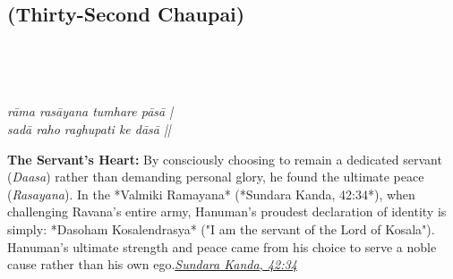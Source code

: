 \subsection*{ (Thirty-Second Chaupai)}

\begin{minipage}[t]{0.55\textwidth}
\vspace{0pt}

{\large \linespread{1.5}\selectfont
{}\\
\par}

\vspace{0.5em}

{\large \linespread{1.5}\selectfont
{}\\
\par}

\vspace{0.5em}

{\large \linespread{1.3}\selectfont
\textit{rāma rasāyana tumhare pāsā |}\\
\textit{sadā raho raghupati ke dāsā ||}
\par}
\end{minipage}%
\hfill
\begin{minipage}[t]{0.42\textwidth}
\vspace{0pt}
\begin{tcolorbox}[anchorbox]
\textbf{The Servant's Heart:} By consciously choosing to remain a dedicated servant (\textit{Daasa}) rather than demanding personal glory, he found the ultimate peace (\textit{Rasayana}). In the *Valmiki Ramayana* (*Sundara Kanda, 42:34*), when challenging Ravana's entire army, Hanuman's proudest declaration of identity is simply: *Dasoham Kosalendrasya* ("I am the servant of the Lord of Kosala").
\vspace{0.5em}\newline Hanuman's ultimate strength and peace came from his choice to serve a noble cause rather than his own ego.\newline\null\hfill\href{https://www.valmiki.iitk.ac.in/sloka?field_kanda_tid=5&language=dv&field_sarga_value=42}{\textit{Sundara Kanda, 42:34}}
\end{tcolorbox}
\end{minipage}


